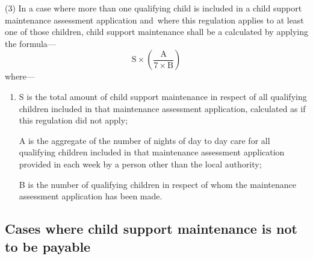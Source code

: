 \documentclass[12pt,a4paper]{article}
\begin{document}
(3) In a case where more than one qualifying child is included in a child support maintenance assessment application and~where this regulation applies to at least one of those children, child support maintenance shall be a calculated by applying the formula—
\[ \mathrm{S} \times \left( \frac{\mathrm{A}}{7 \times \mathrm{B}} \right)  \]
where—
\begin{enumerate}\item[]
S is the total amount of child support maintenance in respect of all qualifying children included in that maintenance assessment application, calculated as if this regulation did not apply;

A is the aggregate of the number of nights of day to day care for all qualifying children included in that maintenance assessment application provided in each week by a person other than the local authority;

B is the number of qualifying children in respect of whom the maintenance assessment application has been made.
\end{enumerate}


\subsection[26. Cases where child support maintenance is not to be payable]{Cases where child support maintenance is not to be payable}
\end{document}
